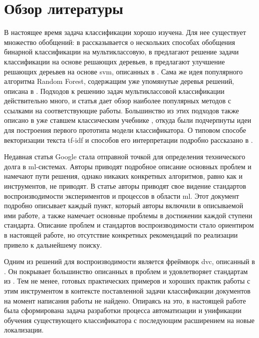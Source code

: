 \chapter*{Обзор литературы}
В настоящее время задача классификации хорошо изучена.
Для нее существует множество обобщений: в \cite{binclass-generalization-3} рассказывается о нескольких способах обобщения бинарной классификации на мультиклассовую, в \cite{decision-trees-original} предлагают решение задачи классификации на основе решающих деревьев, в \cite{binclass-generalization-1,lee_N-1} предлагают улучшение решающих дереьвев на основе \gls{svm}, описанных в \cite{svm_original}.
Сама же идея популярного алгоритма Random Forest, содержащим уже упомянутые деревья решений, описана в \cite{cite:random-forest}.
Подходов к решению задач мультиклассовой классификации действительно много, и статья \cite{multi_class_review} дает обзор наиболее популярных методов с ссылками на соответствующие работы.
Большинство из этих подходов также описано в уже ставшем классическим учебнике \cite{bishop}, откуда были подчерпнуты идеи для построения первого прототипа модели классификатора.
О типовом способе векторизации текста \acrshort{tf-idf} и способов его интерпретации подробно рассказано в \cite{cite:tf-idf-interpretation}.

Недавная статья Google \cite{cite:ml-debt} стала отправной точкой для определения технического долга в \acrshort{ml}-системах.
Авторы приводят подробное описание основных проблем и намечают пути решения, однако никаких конкретных алгоритмов, равно как и инструментов, не приводят.
В статье \cite{cite:ml-reproducibility} авторы приводят свое видение стандартов воспроизводимости экспериментов и процессов в области \acrshort{ml}.
Этот документ подробно описывает каждый пункт, который авторы включили в описываемой ими работе, а также намечает основные проблемы в достижении каждой ступени стандарта.
Описание проблем и стандартов воспроизводимости стало ориентиром в настоящей работе, но отсутствие конкретных рекомендаций по реализации привело к дальнейшему поиску.

Одним из решений для воспроизводимости является фреймворк \gls{dvc}, описанный в \cite{cite:dvc}.
Он покрывает большинство описанных в \cite{cite:ml-debt} проблем и удовлетворяет стандартам из \cite{cite:ml-reproducibility}.
Тем не менее, готовых практических примеров и хороших практик работы с этим инструментом в контексте поставленной задачи классификации документов на момент написания работы не найдено.
Опираясь на это, в настоящей работе была сформирована задача разработки процесса автоматизации и унификации обучения существующего классификатора с последующим расширением на новые локализации.
